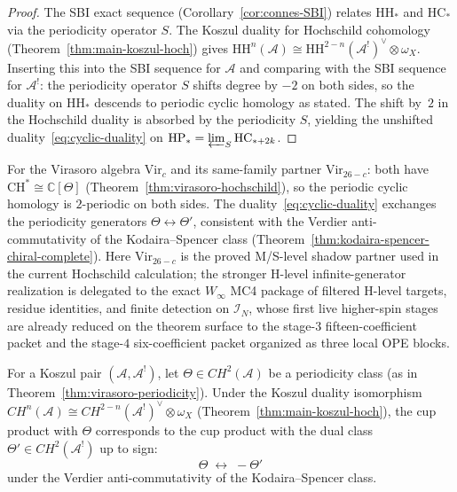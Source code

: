 \begin{proof}
The SBI exact sequence (Corollary~\ref{cor:connes-SBI}) relates $\mathrm{HH}_*$ and $\mathrm{HC}_*$ via the periodicity operator $S$.  The Koszul duality for Hochschild cohomology (Theorem~\ref{thm:main-koszul-hoch}) gives $\mathrm{HH}^n(\mathcal{A}) \cong \mathrm{HH}^{2-n}(\mathcal{A}^!)^\vee \otimes \omega_X$.  Inserting this into the SBI sequence for $\mathcal{A}$ and comparing with the SBI sequence for $\mathcal{A}^!$: the periodicity operator $S$ shifts degree by $-2$ on both sides, so the duality on $\mathrm{HH}_*$ descends to periodic cyclic homology as stated.  The shift by~$2$ in the Hochschild duality is absorbed by the periodicity $S$, yielding the unshifted duality~\eqref{eq:cyclic-duality} on $\mathrm{HP}_* = \varprojlim_S \mathrm{HC}_{*+2k}$.
\end{proof}

\begin{remark}\label{rem:cyclic-koszul-virasoro}
For the Virasoro algebra $\mathrm{Vir}_c$ and its same-family partner
$\mathrm{Vir}_{26-c}$: both have $\mathrm{CH}^* \cong \mathbb{C}[\Theta]$
(Theorem~\ref{thm:virasoro-hochschild}), so the periodic cyclic
homology is $2$-periodic on both sides.  The duality~\eqref{eq:cyclic-duality}
exchanges the periodicity generators $\Theta \leftrightarrow \Theta'$,
consistent with the Verdier anti-commutativity of the Kodaira--Spencer
class (Theorem~\ref{thm:kodaira-spencer-chiral-complete}).  Here
$\mathrm{Vir}_{26-c}$ is the proved M/S-level shadow partner used in the
current Hochschild calculation; the stronger H-level infinite-generator
realization is delegated to the exact $W_\infty$ MC4 package of
filtered H-level targets, residue identities, and finite detection on
$\mathcal{I}_N$, whose first live higher-spin stages are already
reduced on the theorem surface to the stage-$3$ fifteen-coefficient
packet and the stage-$4$ six-coefficient packet organized as three
local OPE blocks.
\end{remark}

\begin{corollary}
\label{cor:hochschild-cup-exchange}
For a Koszul pair $(\mathcal{A}, \mathcal{A}^!)$, let $\Theta \in CH^2(\mathcal{A})$ be a periodicity class \textup{(}as in Theorem~\textup{\ref{thm:virasoro-periodicity})}.  Under the Koszul duality isomorphism $CH^n(\mathcal{A}) \cong CH^{2-n}(\mathcal{A}^!)^\vee \otimes \omega_X$ \textup{(}Theorem~\textup{\ref{thm:main-koszul-hoch})}, the cup product with $\Theta$ corresponds to the cup product with the dual class $\Theta' \in CH^2(\mathcal{A}^!)$ up to sign:
\begin{equation}\label{eq:cup-product-exchange}
\Theta \;\longleftrightarrow\; -\Theta'
\end{equation}
under the Verdier anti-commutativity of the Kodaira--Spencer class.
\end{corollary}

